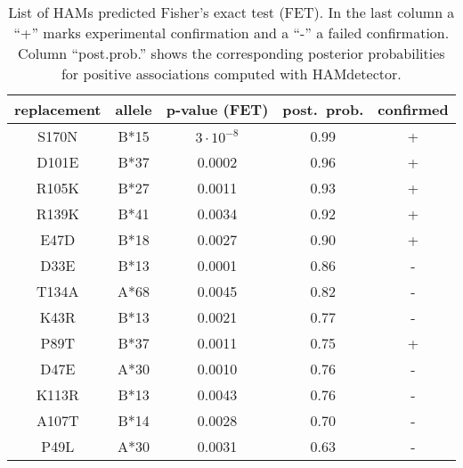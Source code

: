 \documentclass{article}
\begin{document}
\begin{table}[h!]
  \caption{List of HAMs predicted Fisher's exact test (FET). In the last column a ``+'' marks experimental confirmation and a ``-'' a failed confirmation. Column ``post.prob.'' shows the corresponding posterior probabilities for positive associations computed with HAMdetector.}
  \vspace{0.5cm}
  \begin{tabular}{c|c|c|c|c}
  replacement & allele  & p-value (FET) & post.~prob. & confirmed \\
  \hline
  S170N       & B*15 & $3\cdot10^{-8}$      & 0.99                                & +                        \\
  D101E       & B*37 & 0.0002                        & 0.96                                & +                        \\
  R105K       & B*27 & 0.0011                        & 0.93                                & +                        \\
  R139K       & B*41 & 0.0034                        & 0.92                                & +                        \\
  E47D        & B*18 & 0.0027                        & 0.90                                & +                        \\
  D33E        & B*13 & 0.0001                        & 0.86                                & -                        \\
  T134A       & A*68 & 0.0045                        & 0.82                                & -                        \\
  K43R        & B*13 & 0.0021                        & 0.77                                & -                        \\
  P89T        & B*37 & 0.0011                        & 0.75                                & +                        \\
  D47E        & A*30 & 0.0010                        & 0.76                                & -                        \\
  K113R       & B*13 & 0.0043                        & 0.76                                & -                        \\
  A107T       & B*14 & 0.0028                        & 0.70                                & -                        \\
  P49L        & A*30 & 0.0031                        & 0.63                                & -                        \\

\end{tabular}
\end{table}
\end{document}
